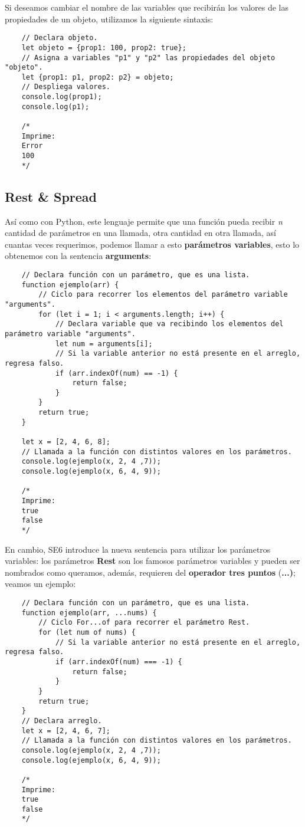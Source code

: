 Si deseamos cambiar el nombre de las variables que recibirán los valores de las propiedades de un objeto, utilizamos la siguiente sintaxis:
\begin{lstlisting}
    // Declara objeto.
    let objeto = {prop1: 100, prop2: true};
    // Asigna a variables "p1" y "p2" las propiedades del objeto "objeto".
    let {prop1: p1, prop2: p2} = objeto;
    // Despliega valores.
    console.log(prop1);
    console.log(p1);

    /*
    Imprime:
    Error
    100
    */
\end{lstlisting}


\subsection{Rest \& Spread}

Así como con Python, este lenguaje permite que una función pueda recibir \textit{n} cantidad de parámetros en una llamada, otra cantidad en otra llamada, así cuantas veces requerimos, podemos llamar a esto \textbf{parámetros variables}, esto lo obtenemos con la sentencia \textbf{arguments}:
\begin{lstlisting}
    // Declara función con un parámetro, que es una lista.
    function ejemplo(arr) {
        // Ciclo para recorrer los elementos del parámetro variable "arguments".
        for (let i = 1; i < arguments.length; i++) {
            // Declara variable que va recibindo los elementos del parámetro variable "arguments".
            let num = arguments[i];
            // Si la variable anterior no está presente en el arreglo, regresa falso.
            if (arr.indexOf(num) == -1) {
                return false;
            }
        }
        return true;
    }
    
    let x = [2, 4, 6, 8];
    // Llamada a la función con distintos valores en los parámetros.
    console.log(ejemplo(x, 2, 4 ,7));
    console.log(ejemplo(x, 6, 4, 9));

    /*
    Imprime:
    true
    false
    */
\end{lstlisting}

En cambio, SE6 introduce la nueva sentencia para utilizar los parámetros variables: los parámetros \textbf{Rest} son los famosos parámetros variables y pueden ser nombrados como queramos, además, requieren del \textbf{operador tres puntos} (\textbf{...)}; veamos un ejemplo:
\begin{lstlisting}
    // Declara función con un parámetro, que es una lista.
    function ejemplo(arr, ...nums) {
        // Ciclo For...of para recorrer el parámetro Rest.
        for (let num of nums) {
            // Si la variable anterior no está presente en el arreglo, regresa falso.
            if (arr.indexOf(num) === -1) {
                return false;
            }
        }
        return true;
    }
    // Declara arreglo.
    let x = [2, 4, 6, 7];
    // Llamada a la función con distintos valores en los parámetros.
    console.log(ejemplo(x, 2, 4 ,7));
    console.log(ejemplo(x, 6, 4, 9));

    /*
    Imprime:
    true
    false
    */
\end{lstlisting}

